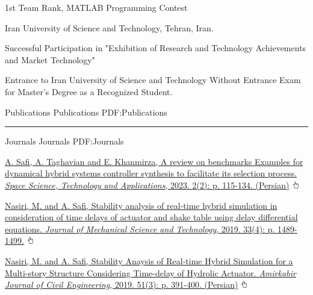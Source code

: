 \documentclass[letterpaper,MMMyyyy,nonstopmode]{ResumeTemplate}
\begin{document}
\begin{Body}
\Gap
\vspace{5pt}
\BulletItem
1st Team Rank, MATLAB Programming Contest
\hfill
{}
\begin{Detail}
\Item
Iran University of Science and Technology, Tehran, Iran.
\end{Detail}

\Gap
\vspace{5pt}
\BulletItem
Successful Participation in "Exhibition of Research and Technology Achievements and Market Technology"
\hfill
{}

\Gap
\vspace{5pt}
\BulletItem
Entrance to Iran University of Science and Technology Without Entrance Exam for Master's Degree as a Recognized Student.
\hfill
{}




\Section
{Publications}
{Publications}
{PDF:Publications}
\textcolor{Forestg}{\vspace{0.05cm}\hrule height 0.1cm}\BigGap
\SubSection
{Journals}
{Journals}
{PDF:Journals}

\begingroup
\renewcommand{\MaxNumberedItem}{[88]}

\BigGap
\NumberedItem{[1]}
\href{https://ceej.aut.ac.ir/article_2911.html}
{\underline{A. Safi}, A. Taghavian and E. Khanmirza, A review on benchmarks Examples for dynamical hybrid systems controller synthesis to facilitate its selection process. \textit{Space Science, Technology and Applications}, 2023. 2(2): p. 115-134. (Persian)}
\includegraphics[height=9pt]{icons/hand-cursor.png}

\Gap
\NumberedItem{[2]}
\href{https://link.springer.com/article/10.1007/s12206-019-0301-6}
{Nasiri, M. and \underline{A. Safi}, Stability analysis of real-time hybrid simulation in consideration of time delays of actuator and shake table using delay differential equations. \textit{Journal of Mechanical Science and Technology}, 2019. 33(4): p. 1489-1499.} \includegraphics[height=9pt]{icons/hand-cursor.png}

\Gap
\NumberedItem{[3]}
\href{https://ceej.aut.ac.ir/article_2911.html}
{Nasiri, M. and \underline{A. Safi}, Stability Anaysis of Real-time Hybrid Simulation for a Multi-story Structure Considering Time-delay of Hydrolic Actuator. \textit{Amirkabir Journal of Civil Engineering}, 2019. 51(3): p. 391-400. (Persian)} \includegraphics[height=9pt]{icons/hand-cursor.png}


\end{Body}
\end{document}
